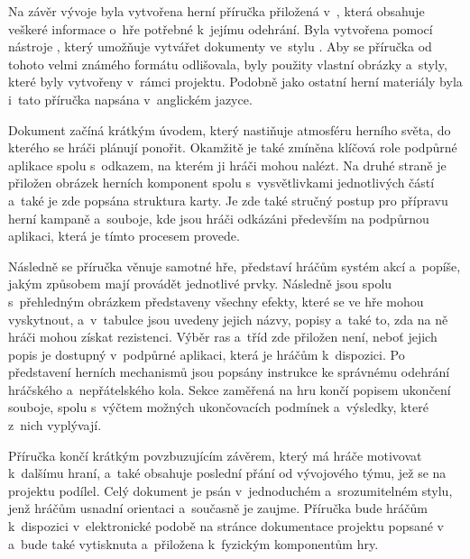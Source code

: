 Na závěr vývoje byla vytvořena herní příručka přiložená v~, která obsahuje veškeré informace o~hře potřebné k~jejímu odehrání. Byla vytvořena pomocí nástroje , který umožňuje vytvářet dokumenty ve~stylu \dnd{}. Aby se příručka od tohoto velmi známého formátu odlišovala, byly použity vlastní obrázky a~styly, které byly vytvořeny v~rámci projektu. Podobně jako ostatní herní materiály byla i~tato příručka napsána v~anglickém jazyce.

Dokument začíná krátkým úvodem, který nastiňuje atmosféru herního světa, do kterého se hráči plánují ponořit. Okamžitě je také zmíněna klíčová role podpůrné aplikace spolu s~odkazem, na kterém ji hráči mohou nalézt. Na druhé straně je přiložen obrázek herních komponent spolu s~vysvětlivkami jednotlivých částí a~také je zde popsána struktura karty. Je zde také stručný postup pro přípravu herní kampaně a~souboje, kde jsou hráči odkázáni především na podpůrnou aplikaci, která je tímto procesem provede.

Následně se příručka věnuje samotné hře, představí hráčům systém akcí a~popíše, jakým způsobem mají provádět jednotlivé prvky. Následně jsou spolu s~přehledným obrázkem představeny všechny efekty, které se ve hře mohou vyskytnout, a~v~tabulce jsou uvedeny jejich názvy, popisy a~také to, zda na ně hráči mohou získat rezistenci. Výběr ras a~tříd zde přiložen není, neboť jejich popis je dostupný v~podpůrné aplikaci, která je hráčům k~dispozici. Po představení herních mechanismů jsou popsány instrukce ke správnému odehrání hráčského a~nepřátelského kola. Sekce zaměřená na hru končí popisem ukončení souboje, spolu s~výčtem možných ukončovacích podmínek a~výsledky, které z~nich vyplývají.

Příručka končí krátkým povzbuzujícím závěrem, který má hráče motivovat k~dalšímu hraní, a~také obsahuje poslední přání od vývojového týmu, jež se na projektu podílel. Celý dokument je psán v~jednoduchém a~srozumitelném stylu, jenž hráčům usnadní orientaci a~současně je zaujme. Příručka bude hráčům k~dispozici v~elektronické podobě na stránce dokumentace projektu popsané v~ a~bude také vytisknuta a~přiložena k~fyzickým komponentům hry.

